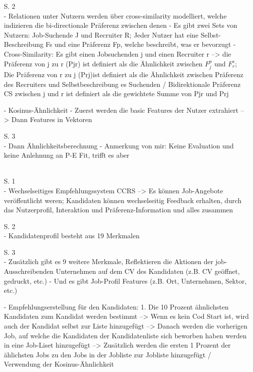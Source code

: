 S. 2\\
- Relationen unter Nutzern werden über cross-similarity modelliert, welche indizieren die bi-directionale Präferenz zwischen denen
- Es gibt zwei Sets von Nutzern: Job-Suchende J und Recruiter R; Jeder Nutzer hat eine Selbst-Beschreibung Fs und eine Präferenz Fp, welche beschreibt, was er bevorzugt
- Cross-Similarity: Es gibt einen Jobsuchenden j und einen Recruiter r --> die Präferenz von j zu r (Pjr) ist definiert als die Ähnlichkeit zwischen $F_j^p$ und $F_r^s$; Die Präferenz von r zu j (Prj)ist definiert als die Ähnlichkeit zwischen Präferenz des Recruiters und Selbstbeschreibung es Suchenden / Bidirektionale Präferenz CS zwischen j und r ist definiert als die gewichtete Summe von Pjr und Prj

- Kosinus-Ähnlichkeit
- Zuerst werden die basic Features der Nutzer extrahiert --> Dann Features in Vektoren

S. 3\\
- Dann Ähnlichkeitsberechnung
- Anmerkung von mir: Keine Evaluation und keine Anlehnung an P-E Fit, trifft es aber

\textcite{oezcan:2016}\\
S. 1\\
- Wechselseitiges Empfehlungssystem CCRS --> Es können Job-Angebote veröffentlicht weren; Kandidaten können wechselseitig Feedback erhalten, durch das Nutzerprofil, Interaktion und Präferenz-Information und alles zusammen

S. 2\\
- Kandidatenprofil besteht aus 19 Merkmalen

S. 3\\
- Zusätzlich gibt es 9 weitere Merkmale, Reflektieren die Aktionen der job-Ausschreibenden Unternehmen auf dem CV des Kandidaten (z.B. CV geöffnet, gedruckt, etc.)
- Und es gibt Job-Profil Features (z.B. Ort, Unternehmen, Sektor, etc.)

- Empfehlungserstellung für den Kandidaten: 1. Die 10 Prozent ähnlichsten Kandidaten zum Kandidat werden bestimmt --> Wenn es kein Cod Start ist, wird auch der Kandidat selbst zur Liste hinzugefügt --> Danach werden die vorherigen Job, auf welche die Kandidaten der Kandidatenliste sich beworben haben werden in eine Job-Liset hinzugefügt --> Zusätzlich werden die ersten 1 Prozent der ählichsten Jobs zu den Jobs in der Jobliste zur Jobliste hinzugefügt / Verwendung der Kosinus-Ähnlichkeit

